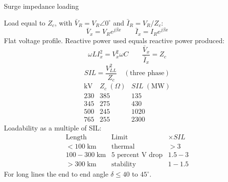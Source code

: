 Surge impedance loading

Load equal to $Z_c$, with $\bar V_R=V_R\angle0^{\circ}$ and $\bar I_R=V_R/Z_c$:
$$\bar V_x=V_Re^{j\beta x}\qquad \bar I_x=I_Re^{j\beta x}$$
Flat voltage profile. Reactive power used equals reactive power produced:
$$\omega LI_x^2=V_x^2\omega C\qquad \frac{\bar V_x}{\bar I_x}=Z_c$$
$$SIL=\frac{V_{LL}^2}{Z_c}\quad(\text{three phase})$$
$$\begin{array}{c|cc}\text{kV}&Z_c\;(\Omega)&SIL\;(\text{MW})\\230&385&135\\345&275&430\\500&245&1020\\765&255&2300\end{array}$$
Loadability as a multiple of SIL:
$$\begin{array}{lll}\text{Length}&\text{Limit}&\times SIL\\<100\;\text{km}&\text{thermal}&>3\\100-300\;\text{km}&5\text{ percent V drop}&1.5-3\\>300\;\text{km}&\text{stability}&1-1.5\end{array}$$
For long lines the end to end angle $\delta\le40$ to $45^{\circ}$.
